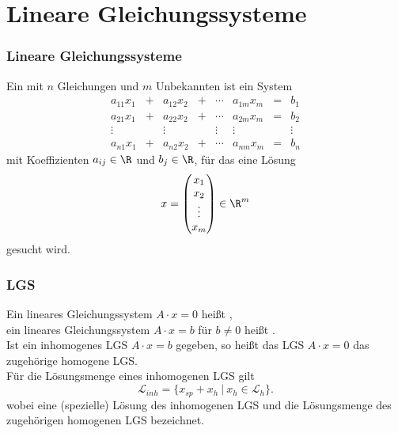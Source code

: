 \section{Lineare Gleichungssysteme}
%
%
\begin{frame}\frametitle{Lineare Gleichungssysteme}

	Ein 	 mit $n$ Gleichungen und $m$ Unbekannten ist ein System
	$$
		\begin{array}{ccccccccc}
			a_{11}x_1	&+	&a_{12}x_2	&+	&\cdots	&a_{1m}x_m	&=	& b_1 \\
			a_{21}x_1	&+	&a_{22}x_2 	&+	&\cdots	&a_{2m}x_m	&=	& b_2 \\
			\vdots	&	&\vdots		&	&\vdots	&\vdots		&	& \vdots\\
			a_{n1}x_1	&+ 	&a_{n2}x_2 	&+	&\cdots	&a_{nm}x_m	&=	& b_n 
		\end{array}
	$$
	mit Koeffizienten $a_{ij}\in\R$ und $b_j\in \R$, für das eine Lösung
	$$	
		x
		=
		\begin{pmatrix} 
			x_1\\
			x_2\\
			\vdots\\
			x_m
		\end{pmatrix} 
		\in \R^m
	$$
	gesucht wird.
	
\end{frame}
%
%
\begin{frame}\frametitle{LGS}

	Ein lineares Gleichungssystem
	$
		A\cdot x = 0
	$
	hei{\ss}t ,\\[2mm]
	
	ein lineares Gleichungssystem
	$
		A\cdot x = b
	$
	für $b\neq 0$ hei{\ss}t .\\\vfill
	Ist ein inhomogenes LGS 
	$A\cdot x = b$ 
	gegeben, so hei{\ss}t das LGS $A\cdot x = 0$ das zugehörige homogene LGS.\\\vfill
	Für die Lösungsmenge eines inhomogenen LGS gilt
	$$
 		\mathcal{L}_{inh} = \{ x_{sp} + x_h ~|~ x_h \in \mathcal{L}_{h} \}.
	$$
wobei  eine (spezielle) Lösung des inhomogenen LGS und  die Lösungsmenge des zugehörigen homogenen LGS bezeichnet.
\end{frame}
%
%
